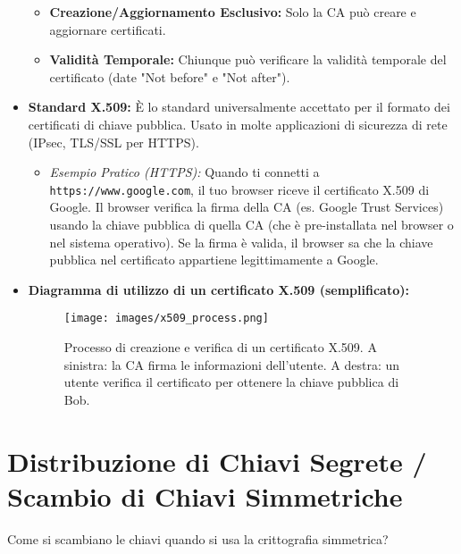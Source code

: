\documentclass{article}
\begin{document}
\begin{itemize}
\begin{itemize}
            \item \textbf{Creazione/Aggiornamento Esclusivo:} Solo la CA può creare e aggiornare certificati.
            \item \textbf{Validità Temporale:} Chiunque può verificare la validità temporale del certificato (date "Not before" e "Not after").
        \end{itemize}
    \item \textbf{Standard X.509:} È lo standard universalmente accettato per il formato dei certificati di chiave pubblica. Usato in molte applicazioni di sicurezza di rete (IPsec, TLS/SSL per HTTPS).
        \begin{itemize}
            \item \textit{Esempio Pratico (HTTPS):} Quando ti connetti a \texttt{https://www.google.com}, il tuo browser riceve il certificato X.509 di Google. Il browser verifica la firma della CA (es. Google Trust Services) usando la chiave pubblica di quella CA (che è pre-installata nel browser o nel sistema operativo). Se la firma è valida, il browser sa che la chiave pubblica nel certificato appartiene legittimamente a Google.
        \end{itemize}
    \item \textbf{Diagramma di utilizzo di un certificato X.509 (semplificato):}
    \begin{figure}[H]
        \centering
        \texttt{[image: images/x509\_process.png]} %
        \caption{Processo di creazione e verifica di un certificato X.509. A sinistra: la CA firma le informazioni dell'utente. A destra: un utente verifica il certificato per ottenere la chiave pubblica di Bob.}
        \label{fig:x509}
    \end{figure}
\end{itemize}

\section{Distribuzione di Chiavi Segrete / Scambio di Chiavi Simmetriche}
Come si scambiano le chiavi quando si usa la crittografia simmetrica?
\end{document}
